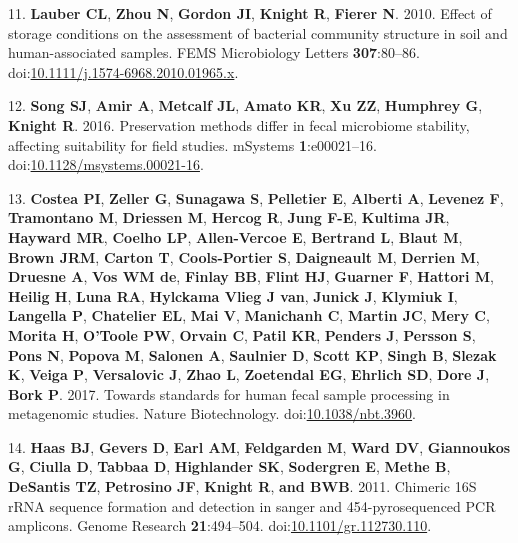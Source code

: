 \documentclass[11pt,]{article}
\begin{document}
\leavevmode\hypertarget{ref-Lauber2010}{}%
11. \textbf{Lauber CL}, \textbf{Zhou N}, \textbf{Gordon JI},
\textbf{Knight R}, \textbf{Fierer N}. 2010. Effect of storage conditions
on the assessment of bacterial community structure in soil and
human-associated samples. FEMS Microbiology Letters \textbf{307}:80--86.
doi:\href{https://doi.org/10.1111/j.1574-6968.2010.01965.x}{10.1111/j.1574-6968.2010.01965.x}.

\leavevmode\hypertarget{ref-Song2016}{}%
12. \textbf{Song SJ}, \textbf{Amir A}, \textbf{Metcalf JL},
\textbf{Amato KR}, \textbf{Xu ZZ}, \textbf{Humphrey G}, \textbf{Knight
R}. 2016. Preservation methods differ in fecal microbiome stability,
affecting suitability for field studies. mSystems \textbf{1}:e00021--16.
doi:\href{https://doi.org/10.1128/msystems.00021-16}{10.1128/msystems.00021-16}.

\leavevmode\hypertarget{ref-Costea2017}{}%
13. \textbf{Costea PI}, \textbf{Zeller G}, \textbf{Sunagawa S},
\textbf{Pelletier E}, \textbf{Alberti A}, \textbf{Levenez F},
\textbf{Tramontano M}, \textbf{Driessen M}, \textbf{Hercog R},
\textbf{Jung F-E}, \textbf{Kultima JR}, \textbf{Hayward MR},
\textbf{Coelho LP}, \textbf{Allen-Vercoe E}, \textbf{Bertrand L},
\textbf{Blaut M}, \textbf{Brown JRM}, \textbf{Carton T},
\textbf{Cools-Portier S}, \textbf{Daigneault M}, \textbf{Derrien M},
\textbf{Druesne A}, \textbf{Vos WM de}, \textbf{Finlay BB},
\textbf{Flint HJ}, \textbf{Guarner F}, \textbf{Hattori M},
\textbf{Heilig H}, \textbf{Luna RA}, \textbf{Hylckama Vlieg J van},
\textbf{Junick J}, \textbf{Klymiuk I}, \textbf{Langella P},
\textbf{Chatelier EL}, \textbf{Mai V}, \textbf{Manichanh C},
\textbf{Martin JC}, \textbf{Mery C}, \textbf{Morita H}, \textbf{O'Toole
PW}, \textbf{Orvain C}, \textbf{Patil KR}, \textbf{Penders J},
\textbf{Persson S}, \textbf{Pons N}, \textbf{Popova M}, \textbf{Salonen
A}, \textbf{Saulnier D}, \textbf{Scott KP}, \textbf{Singh B},
\textbf{Slezak K}, \textbf{Veiga P}, \textbf{Versalovic J}, \textbf{Zhao
L}, \textbf{Zoetendal EG}, \textbf{Ehrlich SD}, \textbf{Dore J},
\textbf{Bork P}. 2017. Towards standards for human fecal sample
processing in metagenomic studies. Nature Biotechnology.
doi:\href{https://doi.org/10.1038/nbt.3960}{10.1038/nbt.3960}.

\leavevmode\hypertarget{ref-Haas2011}{}%
14. \textbf{Haas BJ}, \textbf{Gevers D}, \textbf{Earl AM},
\textbf{Feldgarden M}, \textbf{Ward DV}, \textbf{Giannoukos G},
\textbf{Ciulla D}, \textbf{Tabbaa D}, \textbf{Highlander SK},
\textbf{Sodergren E}, \textbf{Methe B}, \textbf{DeSantis TZ},
\textbf{Petrosino JF}, \textbf{Knight R}, \textbf{and BWB}. 2011.
Chimeric 16S rRNA sequence formation and detection in sanger and
454-pyrosequenced PCR amplicons. Genome Research \textbf{21}:494--504.
doi:\href{https://doi.org/10.1101/gr.112730.110}{10.1101/gr.112730.110}.
\end{document}
